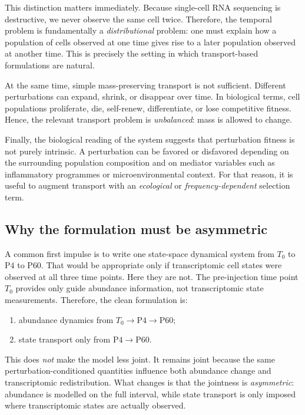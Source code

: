 \documentclass[11pt]{article}
\newcommand{\1}{\mathbf{1}}
\newcommand{\Tzero}{T_0}
\newcommand{\Pfour}{\mathrm{P4}}
\newcommand{\Psixty}{\mathrm{P60}}
\theoremstyle{plain}
\begin{document}
This distinction matters immediately. Because single-cell RNA sequencing is destructive, we never observe the same cell twice. Therefore, the temporal problem is fundamentally a \emph{distributional} problem: one must explain how a population of cells observed at one time gives rise to a later population observed at another time. This is precisely the setting in which transport-based formulations are natural.

At the same time, simple mass-preserving transport is not sufficient. Different perturbations can expand, shrink, or disappear over time. In biological terms, cell populations proliferate, die, self-renew, differentiate, or lose competitive fitness. Hence, the relevant transport problem is \emph{unbalanced}: mass is allowed to change.

Finally, the biological reading of the system suggests that perturbation fitness is not purely intrinsic. A perturbation can be favored or disfavored depending on the surrounding population composition and on mediator variables such as inflammatory programmes or microenvironmental context. For that reason, it is useful to augment transport with an \emph{ecological} or \emph{frequency-dependent} selection term.

\subsection{Why the formulation must be asymmetric}

A common first impulse is to write one state-space dynamical system from $\Tzero$ to $\Pfour$ to $\Psixty$. That would be appropriate only if transcriptomic cell states were observed at all three time points. Here they are not. The pre-injection time point $\Tzero$ provides only guide abundance information, not transcriptomic state measurements. Therefore, the clean formulation is:
\begin{enumerate}
    \item abundance dynamics from $\Tzero \to \Pfour \to \Psixty$;
    \item state transport only from $\Pfour \to \Psixty$.
\end{enumerate}

This does \emph{not} make the model less joint. It remains joint because the same perturbation-conditioned quantities influence both abundance change and transcriptomic redistribution. What changes is that the jointness is \emph{asymmetric}: abundance is modelled on the full interval, while state transport is only imposed where transcriptomic states are actually observed.
\end{document}
